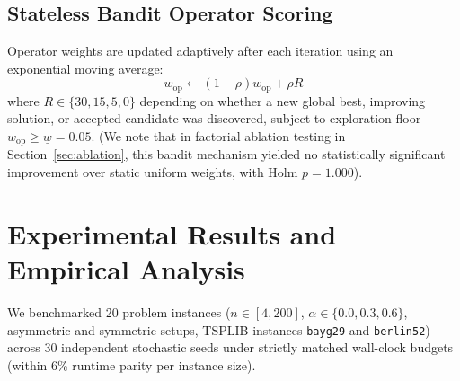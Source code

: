 \documentclass[journal]{IEEEtran}
\begin{document}
\subsection{Stateless Bandit Operator Scoring}
Operator weights are updated adaptively after each iteration using an exponential moving average:
\begin{equation}
    w_{\text{op}} \gets (1 - \rho) w_{\text{op}} + \rho R
\end{equation}
where $R \in \{30, 15, 5, 0\}$ depending on whether a new global best, improving solution, or accepted candidate was discovered, subject to exploration floor $w_{\text{op}} \ge \underline{w} = 0.05$. (We note that in factorial ablation testing in Section~\ref{sec:ablation}, this bandit mechanism yielded no statistically significant improvement over static uniform weights, with Holm $p = 1.000$).

\section{Experimental Results and Empirical Analysis}
\label{sec:results}

We benchmarked 20 problem instances ($n \in [4, 200]$, $\alpha \in \{0.0, 0.3, 0.6\}$, asymmetric and symmetric setups, TSPLIB instances \texttt{bayg29} and \texttt{berlin52}) across 30 independent stochastic seeds under strictly matched wall-clock budgets (within 6\% runtime parity per instance size).
\end{document}
